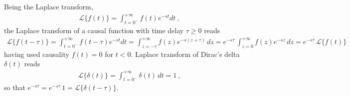 \documentclass[letterpaper,10pt,italian]{jupyterBook}
\begin{document}
\sphinxAtStartPar
Being the Laplace transform,
\begin{equation*}
\begin{split}\mathscr{L}\{ f(t) \} = \int_{t=0^-}^{+\infty} f(t) e^{-st} dt \ ,\end{split}
\end{equation*}
\sphinxAtStartPar
the Laplace transform of a causal function with time delay \(\tau \ge 0\) reads
\begin{equation*}
\begin{split}\mathscr{L}\{ f(t-\tau) \} = \int_{t=0^-}^{+\infty} f(t-\tau) e^{-st} dt = \int_{z = - \tau}^{+\infty} f(z) e^{-s(z+\tau)} \, dz = e^{-s\tau} \, \int_{z = 0}^{+\infty} f(z) e^{-s z} \, dz = e^{-s \tau} \, \mathscr{L}\{ f(t) \}\end{split}
\end{equation*}
\sphinxAtStartPar
having used causality \(f(t) = 0\) for \(t < 0\). Laplace transform of Dirac’s delta \(\delta(t)\) reads
\begin{equation*}
\begin{split}\mathscr{L}\{ \delta(t) \} = \int_{t=0^-}^{+\infty} \delta(t) \, dt = 1 \ ,\end{split}
\end{equation*}
\sphinxAtStartPar
so that \(e^{-s \tau} = e^{- s \tau} \, 1 = \mathscr{L}\{ \delta(t-\tau) \}\).
\end{document}
